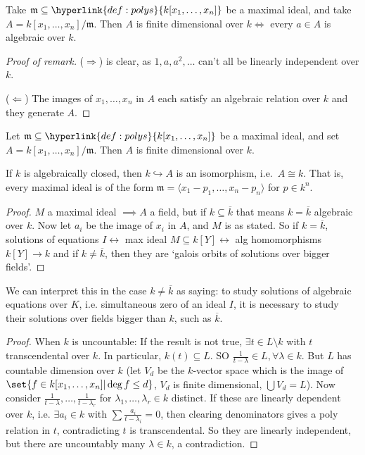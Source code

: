 \documentclass{article}
\begin{document}
\begin{remark}
    Take $\mathfrak{m} \subseteq \hyperlink{def:polys}{k[x_1, \dotsc, x_n]}$ be a maximal ideal, and take $A=k[x_1, \dotsc, x_n]/\mathfrak{m}$. Then $A$ is finite dimensional over $k \iff$ every $a \in A$ is algebraic over $k$.
\end{remark}
\begin{proof}[Proof of remark]
    ($\Rightarrow$) is clear, as $1, a, a^2, \dotsc$ can't all be linearly independent over $k$.

    ($\Leftarrow$) The images of $x_1, \dotsc, x_n$ in $A$ each satisfy an algebraic relation over $k$ and they generate $A$.
\end{proof}

\begin{thm}
    Let $\mathfrak{m} \subseteq \hyperlink{def:polys}{k[x_1, \dotsc, x_n]}$ be a maximal ideal, and set $A=k[x_1, \dotsc, x_n]/\mathfrak{m}$. Then $A$ is finite dimensional over $k$.
\end{thm}
\begin{cor}
    If $k$ is algebraically closed, then $k \hookrightarrow A$ is an isomorphism, i.e.\ $A \cong k$.
    That is, every maximal ideal is of the form $\mathfrak{m}= \langle x_1 - p_1, \dotsc, x_n - p_n \rangle$ for $p \in k^n$.
\end{cor}
\color{gray}
\begin{proof}
    $M$ a maximal ideal $\implies A$ a field, but if $k \subseteq \overline{k}$ that means $k = \overline{k}$ algebraic over $k$. Now let $a_i$ be the image of $x_i$ in $A$, and $M$ is as stated.
    So if $k = \overline{k}$, solutions of equations $I \longleftrightarrow$ max ideal $M \subseteq k[Y] \longleftrightarrow$ alg homomorphisms $k[Y] \to k$ and if $k \neq \overline{k}$, then they are `galois orbits of solutions over bigger fields'.
\end{proof}


We can interpret this in the case $k \neq \overline{k}$ as saying: to study solutions of algebraic equations over $K$, i.e. simultaneous zero of an ideal $I$, it is necessary to study their solutions over fields bigger than $k$, such as $\overline{k}$.
\begin{proof}
    When $k$ is uncountable: If the result is not true, $\exists t \in L\setminus k$ with $t$ transcendental over $k$. In particular, $k(t) \subseteq L$. SO $\frac{1}{t-\lambda} \in L, \forall \lambda \in k$.
    But $L$ has countable dimension over $k$ (let $V_d$ be the $k$-vector space which is the image of $\set{f \in k[x_1, \dotsc, x_n] | \deg f \leq d}$, $V_d$ is finite dimensional, $\bigcup V_d = L$).
    Now consider $\frac{1}{t-\lambda}, \dotsc, \frac{1}{t-\lambda_r}$ for $\lambda_1, \dotsc, \lambda_r \in k$ distinct. If these are linearly dependent over $k$, i.e. $\exists a_i \in k$ with $\sum \frac{a_i}{t - \lambda_i} = 0$, then clearing denominators gives a poly relation in $t$, contradicting $t$ is transcendental.
    So they are linearly independent, but there are uncountably many $\lambda \in k$, a contradiction.
\end{proof}
\end{document}

